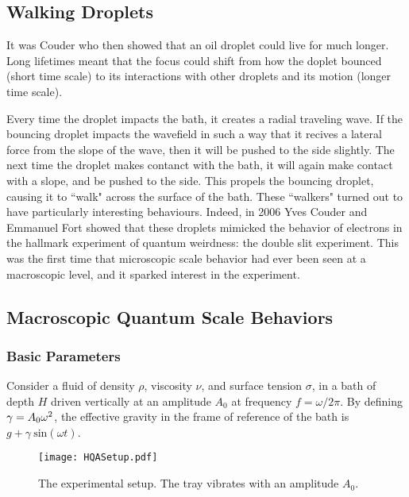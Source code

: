 	    
	 
	    
	    	    \subsection{Walking Droplets}
	    
	       It was Couder who then showed that an oil droplet could live for much longer. Long lifetimes meant that the focus could shift from how the doplet bounced (short time scale) to its interactions with other droplets and its motion (longer time scale).
	       
	       Every time the droplet impacts the bath, it creates a radial traveling wave. If the bouncing droplet impacts the wavefield in such a way that it recives a lateral force from the slope of the wave, then it will be pushed to the side slightly. The next time the droplet makes contanct with the bath, it will again make contact with a slope, and be pushed to the side. This propels the bouncing droplet, causing it to ``walk" across the surface of the bath. These ``walkers" turned out to have particularly interesting behaviours. Indeed, in 2006 Yves Couder and Emmanuel Fort showed that these droplets mimicked the behavior of electrons in the hallmark experiment of quantum weirdness: the double slit experiment. This was the first time that microscopic scale behavior had ever been seen at a macroscopic level, and it sparked interest in the experiment.
	    
	    
	    \subsection{Macroscopic Quantum Scale Behaviors} 
	    \subsubsection{Basic Parameters}
	       Consider a fluid of density $\rho$, viscosity $\nu$, and surface tension $\sigma$, in a bath of depth $H$ driven vertically at an amplitude $A_0$ at frequency $f=\omega/{2\pi}$. By defining $\mathnormal{\gamma}=A_0\omega^2$, the effective gravity in the frame of reference of the bath is $g+\gamma~\mathrm{sin}(\omega t)$. 
	       
	   \begin{figure}[h]
	       \centering
	    \texttt{[image: HQASetup.pdf]}
	     \caption{The experimental setup. The tray vibrates with an amplitude $A_0$.}
	 \label{regime}
	\end{figure}
	       
